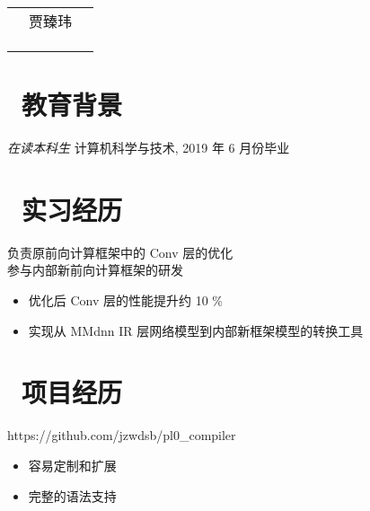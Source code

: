 \documentclass{resume}
\begin{document}

\Large{
  \begin{tabu}{ clr }
    & \scshape{贾臻玮} &  \\
    &  &  \\
    &  &  \\
    &  &  \\
  \end{tabu}
}

\section{\faGraduationCap\ 教育背景}
\textit{在读本科生} 计算机科学与技术, 2019 年 6 月份毕业

\section{\faUsers\ 实习经历}
负责原前向计算框架中的 Conv 层的优化 \\
参与内部新前向计算框架的研发
\begin{itemize}
  \item 优化后 Conv 层的性能提升约 10 \%
  \item 实现从 MMdnn IR 层网络模型到内部新框架模型的转换工具
\end{itemize}

\section{\faUsers\ 项目经历}
https://github.com/jzwdsb/pl0\_compiler
\begin{itemize}
  \item 容易定制和扩展
  \item 完整的语法支持
\end{itemize}
\end{document}
